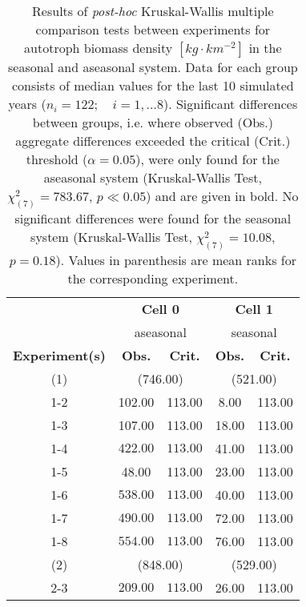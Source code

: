 \begin{table}[ht]
\centering
\small
\caption[Kruskal-Wallis multiple comparison of autotroph biomass density.]{Results of \textit{post-hoc} Kruskal-Wallis multiple comparison 
                tests between experiments for autotroph biomass density $[kg\cdot km^{-2}]$ in the seasonal and aseasonal system. 
                  Data for each group consists of median values for the last 10 simulated years ($n_{i} = 122; \quad i = 1,\ldots8$). 
                  Significant differences between groups, i.e. where observed (Obs.) aggregate differences exceeded the critical (Crit.) threshold ($\alpha = 0.05$), were only found for the aseasonal system (Kruskal-Wallis Test, $\chi^{2}_{(7)} = 783.67$, $p \ll 0.05$) and are given in bold. No significant differences were found for the seasonal system (Kruskal-Wallis Test, $\chi^{2}_{(7)} = 10.08$, $p = 0.18$). Values in parenthesis are mean ranks for the corresponding experiment.} 
\label{tab:chap:res:dyn:autoBMD}
\begin{tabular*}{\textwidth}{@{\extracolsep{\fill} }ccccc}
  \toprule
& \multicolumn{2}{c}{\textbf{Cell 0}} & \multicolumn{2}{c}{\textbf{Cell 1}} \\
& \multicolumn{2}{c}{aseasonal} & \multicolumn{2}{c}{seasonal} \\
\cmidrule(lr){2-3} \cmidrule(lr){4-5}
\textbf{Experiment(s)} & \textbf{Obs.} & \textbf{Crit.} & \textbf{Obs.} & \textbf{Crit.} \\ 
  \midrule
  (1) & \multicolumn{2}{c}{(746.00)} & \multicolumn{2}{c}{(521.00)} \\ 
1-2 & 102.00 & 113.00 & 8.00 & 113.00 \\ 
  1-3 & 107.00 & 113.00 & 18.00 & 113.00 \\ 
  1-4 & \(\mathbf{422.00}\) & \(\mathbf{113.00}\) & 41.00 & 113.00 \\ 
  1-5 & 48.00 & 113.00 & 23.00 & 113.00 \\ 
  1-6 & \(\mathbf{538.00}\) & \(\mathbf{113.00}\) & 40.00 & 113.00 \\ 
  1-7 & \(\mathbf{490.00}\) & \(\mathbf{113.00}\) & 72.00 & 113.00 \\ 
  1-8 & \(\mathbf{554.00}\) & \(\mathbf{113.00}\) & 76.00 & 113.00 \\ [1ex]
  (2) & \multicolumn{2}{c}{(848.00)} & \multicolumn{2}{c}{(529.00)} \\
   2-3 & \(\mathbf{209.00}\) & \(\mathbf{113.00}\) & 26.00 & 113.00 \\ 

\end{tabular*}
\end{table}
